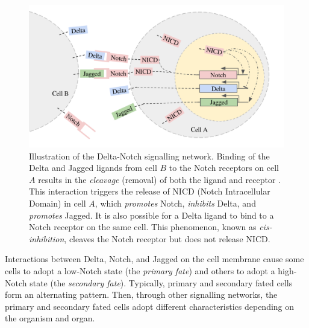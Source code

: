 \documentclass{article}
\begin{document}
\begin{figure}[ht]
  \includegraphics[width=\textwidth]{img/signalling-network.png}
  \caption{
Illustration of the Delta-Notch signalling network.
Binding of the Delta and Jagged ligands from cell $B$ to the Notch receptors on cell $A$ results in the \emph{cleavage} (removal) of both the ligand and receptor \cite{bray_notch_2006}.
This interaction triggers the release of NICD (Notch Intracellular Domain) in cell $A$, which \emph{promotes} Notch, \emph{inhibits} Delta, and \emph{promotes} Jagged.
It is also possible for a Delta ligand to bind to a Notch receptor on the same cell. This phenomenon, known as \emph{cis-inhibition}, cleaves the Notch receptor but does not release NICD.
  }
\end{figure}

Interactions between Delta, Notch, and Jagged on the cell membrane cause some cells to adopt a low-Notch state (the \emph{primary fate}) and others to adopt a high-Notch state (the \emph{secondary fate}).
Typically, primary and secondary fated cells form an alternating pattern.
Then, through other signalling networks, the primary and secondary fated cells adopt different characteristics depending on the organism and organ. 
\end{document}
